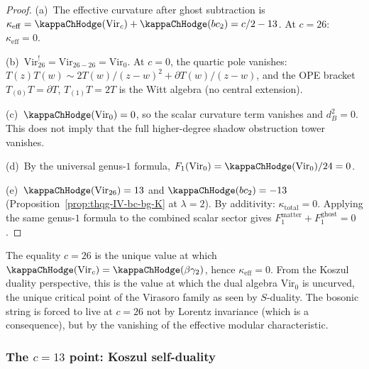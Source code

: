 \begin{proof}
(a)~The effective curvature after ghost subtraction is
$\kappa_{\mathrm{eff}} = \kappaChHodge(\mathrm{Vir}_c) + \kappaChHodge(bc_2)
= c/2 - 13$. At $c = 26$: $\kappa_{\mathrm{eff}} = 0$.

(b)~$\mathrm{Vir}_{26}^! = \mathrm{Vir}_{26-26} = \mathrm{Vir}_0$.
At $c = 0$, the quartic pole vanishes: $T(z)T(w) \sim 2T(w)/(z-w)^2
+ \partial T(w)/(z-w)$, and the OPE bracket $T_{(0)}T = \partial T$,
$T_{(1)}T = 2T$ is the Witt algebra (no central extension).

(c)~$\kappaChHodge(\mathrm{Vir}_0) = 0$, so the scalar curvature term
vanishes and $d_B^2 = 0$. This does not imply that the full
higher-degree shadow obstruction tower vanishes.

(d)~By the universal genus-$1$ formula,
$F_1(\mathrm{Vir}_0) = \kappaChHodge(\mathrm{Vir}_0)/24 = 0$.

(e)~$\kappaChHodge(\mathrm{Vir}_{26}) = 13$ and $\kappaChHodge(bc_2) = -13$
(Proposition~\ref{prop:thqg-IV-bc-bg-K} at $\lambda = 2$).
By additivity: $\kappa_{\mathrm{total}} = 0$. Applying the same
genus-$1$ formula to the combined scalar sector gives
$F_1^{\mathrm{matter}} + F_1^{\mathrm{ghost}} = 0$.
\end{proof}

\begin{remark}
The equality $c = 26$ is the unique value at which
$\kappaChHodge(\mathrm{Vir}_c) = \kappaChHodge(\beta\gamma_2)$, hence
$\kappa_{\mathrm{eff}} = 0$. From the Koszul duality perspective,
this is the value at which the dual algebra $\mathrm{Vir}_0$ is
uncurved, the unique critical point of the Virasoro family
as seen by $S$-duality. The bosonic string is forced to live
at $c = 26$ not by Lorentz invariance (which is a consequence),
but by the vanishing of the effective modular characteristic.
\end{remark}

\subsubsection{The \texorpdfstring{$c = 13$}{c = 13} point:
Koszul self-duality}

